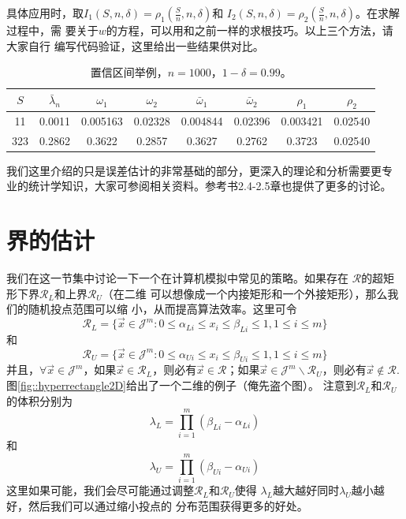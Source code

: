 具体应用时，取$I_1(S, n, \delta) = \rho_1(\frac{S}{n}, n, \delta)$和
$I_2(S, n, \delta) = \rho_2(\frac{S}{n}, n, \delta)$。在求解过程中，需
要关于$w$的方程，可以用和之前一样的求根技巧。以上三个方法，请大家自行
编写代码验证，这里给出一些结果供对比。

\begin{table}[!ht]
   \centering
   \caption{置信区间举例，$n = 1000$，$1 - \delta = 0.99$。}
   \label{table::confidence_intervals_2}
\begin{tabular}{|c|c|c|c|c|c|c|c|}
 \hline
 $S$ & $\bar{\lambda}_n$ & $\omega_1$ & $\omega_2$&
 $\bar{\omega}_1$&$\bar{\omega}_2$&
 $\rho_1$&$\rho_2$\\
 \hline
 11&0.0011&0.005163&0.02328&0.004844&0.02396&0.003421&0.02540\\
 \hline
 323&0.2862&0.3622&0.2857&0.3627&0.2762&0.3723&0.02540\\
 \hline
\end{tabular}
\end{table}

我们这里介绍的只是误差估计的非常基础的部分，更深入的理论和分析需要更专
业的统计学知识，大家可参阅相关资料。参考书2.4-2.5章也提供了更多的讨论。

\section{界的估计}
我们在这一节集中讨论一下一个在计算机模拟中常见的策略。如果存在
$\mathscr{R}$的超矩形下界$\mathscr{R}_L$和上界$\mathscr{R}_U$（在二维
  可以想像成一个内接矩形和一个外接矩形），那么我们的随机投点范围可以缩
小，从而提高算法效率。这里可令
\begin{equation}
  \mathscr{R}_{L} = \{\vec{x} \in \mathscr{J}^m : 0 \leq \alpha_{Li} \leq x_i
  \leq \beta_{Li} \leq 1, 1 \leq i \leq m\}
\end{equation}
和
\begin{equation}
  \mathscr{R}_{U} = \{\vec{x} \in \mathscr{J}^m : 0 \leq \alpha_{Ui} \leq x_i
  \leq \beta_{Ui} \leq 1, 1 \leq i \leq m\}
\end{equation}
并且，$\forall \vec{x} \in \mathscr{J}^m$，如果$\vec{x} \in
\mathscr{R}_L$，则必有$\vec{x} \in \mathscr{R}$；如果$\vec{x} \in
\mathscr{J}^m \backslash \mathscr{R}_U$，则必有$\vec{x} \notin
\mathscr{R}$.图\ref{fig::hyperrectangle2D}给出了一个二维的例子（俺先盗个图）。
注意到$\mathscr{R}_L$和$\mathscr{R}_U$的体积分别为
\begin{equation}
  \lambda_L = \prod_{i = 1}^m(\beta_{Li} - \alpha_{Li})
  \label{eq::area_lower}
\end{equation}
和
\begin{equation}
  \lambda_U = \prod_{i = 1}^m(\beta_{Ui} - \alpha_{Ui})
  \label{eq::area_upper}
\end{equation}
这里如果可能，我们会尽可能通过调整$\mathscr{R}_L$和$\mathscr{R}_U$使得
$\lambda_L$越大越好同时$\lambda_U$越小越好，然后我们可以通过缩小投点的
分布范围获得更多的好处。


